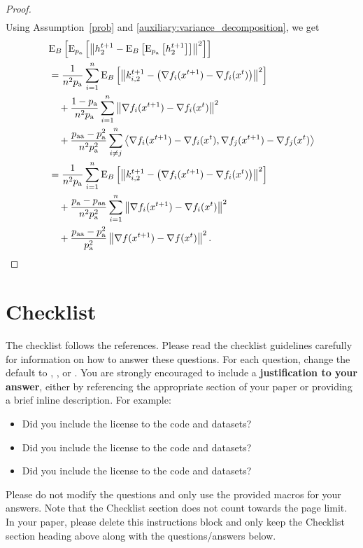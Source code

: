 \documentclass{article}
\begin{document}
\begin{proof}
\begin{align*}
  \end{align*}
  Using Assumption~\ref{prob} and \eqref{auxiliary:variance_decomposition}, we get
  \begin{align*}
    &{\rm E}_{B}\left[{\rm E}_{p_{\textnormal{a}}}\left[\left\| h^{t+1}_{2} - {\rm E}_{B}\left[{\rm E}_{p_{\textnormal{a}}}\left[h^{t+1}_{2}\right]\right] \right\|^2\right]\right]\\
    &=\frac{1}{n^2 p_{\textnormal{a}}}\sum_{i=1}^n{\rm E}_{B}\left[\left\| k^{t+1}_{i, 2} - \left(\nabla f_i(x^{t+1}) - \nabla f_i(x^{t})\right) \right\|^2\right] \\
    &\quad + \frac{1 - p_{\textnormal{a}}}{n^2 p_{\textnormal{a}}}\sum_{i=1}^n\left\| \nabla f_i(x^{t+1}) - \nabla f_i(x^{t}) \right\|^2 \\
    &\quad +\frac{p_{\textnormal{aa}} - p_{\textnormal{a}}^2}{n^2 p_{\textnormal{a}}^2}\sum_{i\neq j}^n\left\langle\nabla f_i(x^{t+1}) - \nabla f_i(x^{t}),\nabla f_j(x^{t+1}) - \nabla f_j(x^{t})\right\rangle \\
    &=\frac{1}{n^2 p_{\textnormal{a}}}\sum_{i=1}^n{\rm E}_{B}\left[\left\| k^{t+1}_{i, 2} - \left(\nabla f_i(x^{t+1}) - \nabla f_i(x^{t})\right) \right\|^2\right] \\
    &\quad + \frac{p_{\textnormal{a}} - p_{\textnormal{aa}}}{n^2 p_{\textnormal{a}}^2}\sum_{i=1}^n\left\| \nabla f_i(x^{t+1}) - \nabla f_i(x^{t}) \right\|^2 \\
    &\quad +\frac{p_{\textnormal{aa}} - p_{\textnormal{a}}^2}{p_{\textnormal{a}}^2}\left\| \nabla f(x^{t+1}) - \nabla f(x^{t}) \right\|^2.
  \end{align*}
\end{proof}

\newpage
\section*{Checklist}

The checklist follows the references.  Please
read the checklist guidelines carefully for information on how to answer these
questions.  For each question, change the default \answerTODO{} to \answerYes{},
\answerNo{}, or \answerNA{}.  You are strongly encouraged to include a {\bf
justification to your answer}, either by referencing the appropriate section of
your paper or providing a brief inline description.  For example:
\begin{itemize}
  \item Did you include the license to the code and datasets? 
  \item Did you include the license to the code and datasets? 
  \item Did you include the license to the code and datasets? \answerNA{}
\end{itemize}
Please do not modify the questions and only use the provided macros for your
answers.  Note that the Checklist section does not count towards the page
limit.  In your paper, please delete this instructions block and only keep the
Checklist section heading above along with the questions/answers below.
\end{document}
